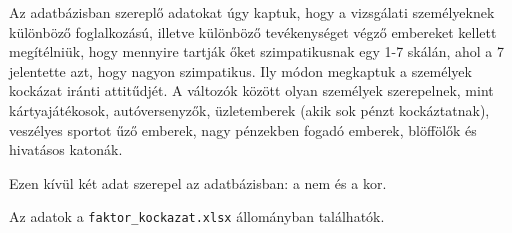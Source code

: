 \documentclass[
  letterpaper,
]{krantz}
\makeatletter
\newenvironment{Shaded}{\begin{snugshade}}{\end{snugshade}}
\newcommand{\AttributeTok}[1]{\textcolor[rgb]{0.40,0.45,0.13}{#1}}
\newcommand{\CommentTok}[1]{\textcolor[rgb]{0.37,0.37,0.37}{#1}}
\newcommand{\FunctionTok}[1]{\textcolor[rgb]{0.28,0.35,0.67}{#1}}
\newcommand{\NormalTok}[1]{\textcolor[rgb]{0.00,0.23,0.31}{#1}}
\newcommand{\OtherTok}[1]{\textcolor[rgb]{0.00,0.23,0.31}{#1}}
\newcommand{\SpecialCharTok}[1]{\textcolor[rgb]{0.37,0.37,0.37}{#1}}
\newcommand{\StringTok}[1]{\textcolor[rgb]{0.13,0.47,0.30}{#1}}
\newenvironment{kframe}{%
\medskip{}
\setlength{\fboxsep}{.8em}
 \def\at@end@of@kframe{}%
 \ifinner\ifhmode%
  \def\at@end@of@kframe{\end{minipage}}%
  \begin{minipage}{\columnwidth}%
 \fi\fi%
 \def\FrameCommand##1{\hskip\@totalleftmargin \hskip-\fboxsep
 \colorbox{shadecolor}{##1}\hskip-\fboxsep
     \hskip-\linewidth \hskip-\@totalleftmargin \hskip\columnwidth}%
 \MakeFramed {\advance\hsize-\width
   \@totalleftmargin\z@ \linewidth\hsize
   \@setminipage}}%
 {\par\unskip\endMakeFramed%
 \at@end@of@kframe}
\renewenvironment{Shaded}{\begin{kframe}}{\end{kframe}}
\makeatother
\begin{document}
Az adatbázisban szereplő adatokat úgy kaptuk, hogy a vizsgálati
személyeknek különböző foglalkozású, illetve különböző tevékenységet
végző embereket kellett megítélniük, hogy mennyire tartják őket
szimpatikusnak egy 1-7 skálán, ahol a 7 jelentette azt, hogy nagyon
szimpatikus. Ily módon megkaptuk a személyek kockázat iránti attitűdjét.
A változók között olyan személyek szerepelnek, mint kártyajátékosok,
autóversenyzők, üzletemberek (akik sok pénzt kockáztatnak), veszélyes
sportot űző emberek, nagy pénzekben fogadó emberek, blöffölők és
hivatásos katonák.

Ezen kívül két adat szerepel az adatbázisban: a nem és a kor.

Az adatok a \texttt{faktor\_kockazat.xlsx} állományban találhatók.

\begin{Shaded}
\end{Shaded}
\end{document}
